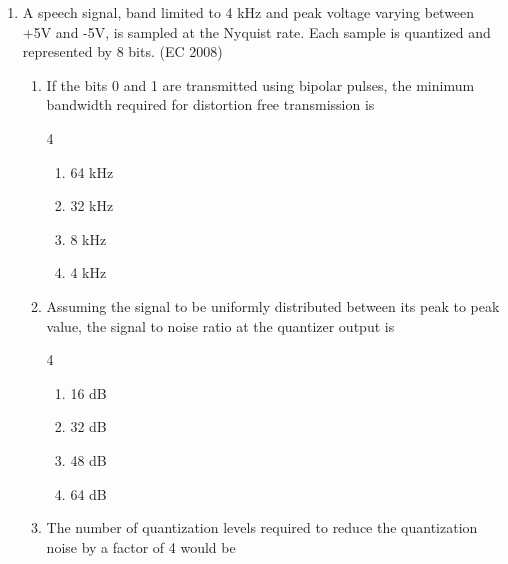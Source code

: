 \begin{enumerate}[label=\thesubsection.\arabic*,ref=\thesubsection.\theenumi]
\item A speech signal, band limited to 4 kHz and peak voltage varying between +5V and -5V, is sampled at the Nyquist rate. Each sample is quantized and represented by 8 bits.
\hfill (EC 2008)
\begin{enumerate}
\item If the bits 0 and 1 are transmitted using bipolar pulses, the minimum bandwidth required for distortion free transmission is
% 
\begin{multicols}{4}
\begin{enumerate}
  \item 64 kHz
  \item 32 kHz
  \item 8 kHz
  \item 4 kHz
\end{enumerate}
\end{multicols}

\item Assuming the signal to be uniformly distributed between its peak to peak value, the signal to noise ratio at the quantizer output is
 
\begin{multicols}{4}
\begin{enumerate}
  \item 16 dB
  \item 32 dB
  \item 48 dB
  \item 64 dB
\end{enumerate}
\end{multicols}

\item The number of quantization levels required to reduce the quantization noise by a factor of 4 would be
 

\end{enumerate}
\end{enumerate}
